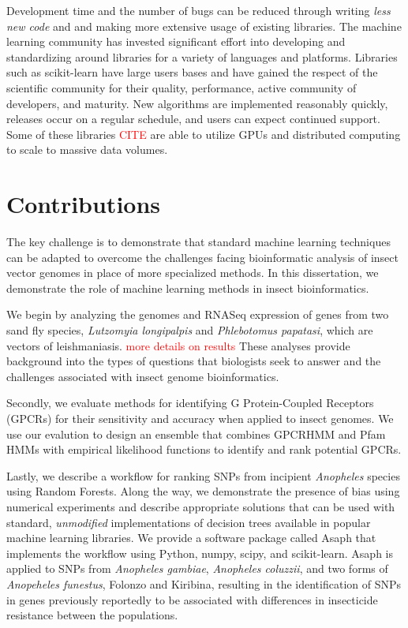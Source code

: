 Development time and the number of bugs can be reduced through writing \emph{less new code} and and making more extensive usage of existing libraries. The machine learning community has invested significant effort into developing and standardizing around libraries for a variety of languages and platforms.  Libraries such as scikit-learn \cite{scikit-learn} have large users bases and have gained the respect of the scientific community for their quality, performance, active community of developers, and maturity. New algorithms are implemented reasonably quickly, releases occur on a regular schedule, and users can expect continued support.  Some of these libraries \textcolor{red}{CITE} are able to utilize GPUs and distributed computing to scale to massive data volumes.

\section{Contributions}
The key challenge is to demonstrate that standard machine learning techniques can be adapted to overcome the challenges facing bioinformatic analysis of insect vector genomes in place of more specialized methods.  In this dissertation, we demonstrate the role of machine learning methods in insect bioinformatics. 

We begin by analyzing the genomes and RNASeq expression of genes from two sand fly species, \emph{Lutzomyia longipalpis} and \emph{Phlebotomus papatasi}, which are vectors of leishmaniasis. \textcolor{red}{more details on results} These analyses provide background into the types of questions that biologists seek to answer and the challenges associated with insect genome bioinformatics.

Secondly, we evaluate methods for identifying G Protein-Coupled Receptors (GPCRs) for their sensitivity and accuracy when applied to insect genomes.  We use our evalution to design an ensemble that combines GPCRHMM and Pfam HMMs with empirical likelihood functions to identify and rank potential GPCRs.

Lastly, we describe a workflow for ranking SNPs from incipient \emph{Anopheles} species using Random Forests.  Along the way, we demonstrate the presence of bias using numerical experiments and describe appropriate solutions that can be used with standard, \emph{unmodified} implementations of decision trees available in popular machine learning libraries. We provide a software package called Asaph that implements the workflow using Python, numpy, scipy, and scikit-learn.  Asaph is applied to SNPs from \emph{Anopheles gambiae}, \emph{Anopheles coluzzii}, and two forms of \emph{Anopeheles funestus}, Folonzo and Kiribina, resulting in the identification of SNPs in genes previously reportedly to be associated with differences in insecticide resistance between the populations.

